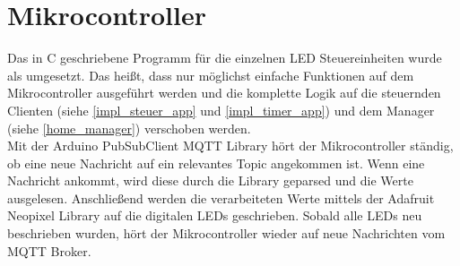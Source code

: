 \section{Mikrocontroller} \label{impl_mikrocontroller}
Das in C geschriebene Programm für die einzelnen LED Steuereinheiten wurde als  umgesetzt. Das heißt, dass nur möglichst einfache Funktionen auf dem Mikrocontroller ausgeführt werden und die komplette Logik auf die steuernden Clienten (siehe \ref{impl_steuer_app} und \ref{impl_timer_app}) und dem Manager (siehe \ref{home_manager}) verschoben werden.\\
Mit der Arduino PubSubClient MQTT Library hört der Mikrocontroller ständig, ob eine neue Nachricht auf ein relevantes Topic angekommen ist. Wenn eine Nachricht ankommt, wird diese durch die  Library geparsed und die Werte ausgelesen. Anschließend werden die verarbeiteten Werte mittels der Adafruit Neopixel Library auf die digitalen LEDs geschrieben. Sobald alle LEDs neu beschrieben wurden, hört der Mikrocontroller wieder auf neue Nachrichten vom MQTT Broker.

